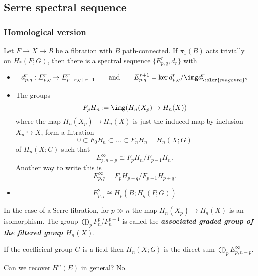 \begin{remark}
\begin{definition}
\subsection{Serre spectral sequence}

\subsubsection{Homological version}

\begin{thm}
	Let $F\to X\to B$ be a fibration with $B$ path-connected. If $\pi_1(B)$ acts trivially on $H_*(F;G)$, then there is a spectral sequence $\{E^r_{p,q},d_r\}$ with
	\begin{itemize}
		\item
			\[d^r_{p,q}:E^r_{p,q}\to E^r_{p-r,q+r-1}\qquad \text{and} \qquad E^{r+1}_{p,q}=\ker d^r_{p,q}/\img d^r_{{\color{magenta}?}}\]
		\item The groups
			\[F_pH_n:=\img(H_n(X_p)\to H_n(X))\]
		where the map $H_{n}(X_p)\to H_{n}(X)$ is just the induced map by inclusion $X_p\hookrightarrow X$, form a filtration
		\[0\subset F_0H_n\subset \ldots\subset F_nH_n=H_n(X;G)\]
		of $H_n(X;G)$ such that
		\[E^\infty_{p,n-p}\cong F_pH_n/F_{p-1}H_n.\]
		Another way to write this is
		\[E_{p,q}^\infty=F_pH_{p+q}\Big/F_{p-1}H_{p+q}.\]
	\item \[E^2_{p,q}\cong H_p(B;H_q(F;G))\]
\end{itemize}
\end{thm}

\begin{remark}
	In the case of a Serre fibration, for $p\gg n$ the map $H_{n}(X_p)\to H_{n}(X)$ is an isomorphism. The group $\bigoplus_{p}F^p_n/F^{p-1}_n$ is called the \textit{\textbf{associated graded group of the filtered group $H_n(X)$}}.
\end{remark}

\begin{remark}
	If the coefficient group $G$ is a field then $H_{n}(X;G)$ is the direct sum $\bigoplus_{p} E^\infty_{p,n-p}$.
\end{remark}

\begin{question}
	Can we recover $H^{n}(E)$ in general? No.
\end{question}


\end{definition}
\end{remark}
